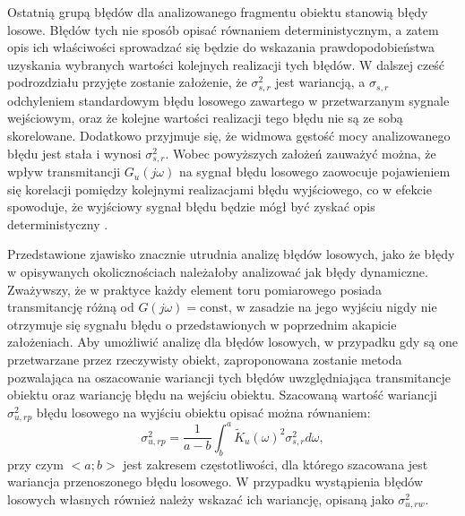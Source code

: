 Ostatnią grupą błędów dla analizowanego fragmentu obiektu stanowią błędy losowe. Błędów tych nie sposób opisać równaniem deterministycznym, a zatem opis ich właściwości sprowadzać się będzie do wskazania prawdopodobieństwa uzyskania wybranych wartości kolejnych realizacji tych błędów. W dalszej cześć podrozdziału przyjęte zostanie założenie, że $\sigma_{s,r}^{2}$ jest wariancją, a $\sigma_{s,r}$ odchyleniem standardowym błędu losowego zawartego w przetwarzanym sygnale wejściowym, oraz że kolejne wartości realizacji tego błędu nie są ze sobą skorelowane. Dodatkowo przyjmuje się, że widmowa gęstość mocy analizowanego błędu jest stała i wynosi $\sigma_{s,r}^{2}$. Wobec powyższych założeń zauważyć można, że wpływ transmitancji $G_{u}(j\omega)$ na sygnał błędu losowego zaowocuje pojawieniem się korelacji pomiędzy kolejnymi realizacjami błędu wyjściowego, co w efekcie spowoduje, że wyjściowy sygnał błędu będzie mógł być zyskać opis deterministyczny \cite{bibbona_filter, benassi_filter}.

Przedstawione zjawisko znacznie utrudnia analizę błędów losowych, jako że błędy w opisywanych okolicznościach należałoby analizować jak błędy dynamiczne. Zważywszy, że w praktyce każdy element toru pomiarowego posiada transmitancję różną od $G(j\omega) = \text{const}$, w zasadzie na jego wyjściu nigdy nie otrzymuje się sygnału błędu o przedstawionych w poprzednim akapicie założeniach. Aby umożliwić analizę dla błędów losowych, w przypadku gdy są one przetwarzane przez rzeczywisty obiekt, zaproponowana zostanie metoda pozwalająca na oszacowanie wariancji tych błędów uwzględniająca transmitancje obiektu oraz wariancję błędu na wejściu obiektu. Szacowaną wartość wariancji $\sigma_{u,rp}^{2}$ błędu losowego na wyjściu obiektu opisać można równaniem:
\begin{equation}
\sigma_{u,rp}^{2} = \frac{1}{a - b} \int _{b} ^{a} \tilde{K}_{u}(\omega)^{2} \sigma_{s,r}^{2} d\omega  \label{eqn_mid_cont_var_rand},
\end{equation}
przy czym $<a;b>$ jest zakresem częstotliwości, dla którego szacowana jest wariancja przenoszonego błędu losowego. W przypadku wystąpienia błędów losowych własnych również należy wskazać ich wariancję, opisaną jako $\sigma_{u,rw}^{2}$.


